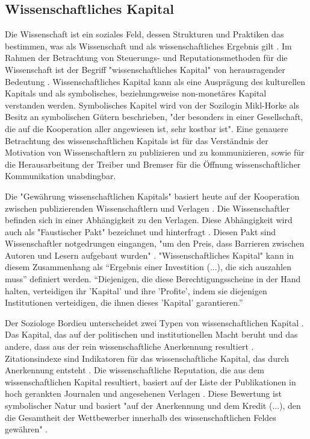 \begin{enumerate}
\begin{end}
\subsection{Wissenschaftliches Kapital}

Die Wissenschaft ist ein soziales Feld, dessen Strukturen und Praktiken das bestimmen, was als Wissenschaft und als wissenschaftliches Ergebnis gilt \cite{mikl_2010_soziologie}. Im Rahmen der Betrachtung von Steuerungs- und Reputationsmethoden für die Wissenschaft ist der Begriff "wissenschaftliches Kapital" von herausragender Bedeutung \cite{suchen}. Wissenschaftliches Kapital kann als eine Ausprägung des kulturellen Kapitals und als symbolisches, beziehungsweise non-monetäres Kapital \cite{irmer2011} \cite{hagner_2015_sache_buches} verstanden werden. Symbolisches Kapitel wird von der Sozilogin Mikl-Horke als Besitz an symbolischen Gütern beschrieben, "der besonders in einer Gesellschaft, die auf die Kooperation aller angewiesen ist, sehr kostbar ist"\cite{mikl_2010_soziologie}. Eine genauere Betrachtung des wissenschaftlichen Kapitals ist für das Verständnis der Motivation von Wissenschaftlern zu publizieren und zu kommunizieren, sowie für die Herausarbeitung der Treiber und Bremser für die Öffnung wissenschaftlicher Kommunikation unabdingbar.

Die "Gewährung wissenschaftlichen Kapitals" basiert heute auf der Kooperation zwischen publizierenden Wissenschaftlern und Verlagen \cite{herb_2006}. Die Wissenschaftler befinden sich in einer Abhängigkeit zu den Verlagen. Diese Abhängigkeit wird auch als "Faustischer Pakt" bezeichnet und hinterfragt \cite{hagner_2015_sache_buches} \cite{Parks_2002_acadamic_faust}. Diesen Pakt sind Wissenschaftler notgedrungen eingangen, "um den Preis, dass Barrieren zwischen Autoren und Lesern aufgebaut wurden" \cite{hagner_2015_sache_buches}. "Wissenschaftliches Kapital" kann in diesem Zusammenhang als “Ergebnis einer Investition (...), die sich auszahlen muss” \cite{herb_2006} definiert werden. “Diejenigen, die diese Berechtigungsscheine in der Hand halten, verteidigen ihr 'Kapital' und ihre 'Profite', indem sie diejenigen Institutionen verteidigen, die ihnen dieses 'Kapital' garantieren.” \cite{Bourdieu_1992}

Der Soziologe Bordieu unterscheidet zwei Typen von wissenschaftlichen Kapital \cite{Bourdieu_1998}. Das Kapital, das auf der politischen und institutionellen Macht beruht und das andere, dass aus der rein wissenschaftliche Anerkennung resultiert \cite{mikl_2010_soziologie}. Zitationsindexe sind Indikatoren für das wissenschaftliche Kapital, das durch Anerkennung entsteht \cite{Bourdieu_1998}. Die wissenschaftliche Reputation, die aus dem wissenschaftlichen Kapital resultiert, basiert auf der Liste der Publikationen in hoch gerankten Journalen und angesehenen Verlagen \cite{herb_2010}. Diese Bewertung ist symbolischer Natur und basiert "auf der Anerkennung und dem Kredit (...), den die Gesamtheit der Wettbewerber innerhalb des wissenschaftlichen Feldes gewähren" \cite{Bourdieu_1998} \cite{herb_2010}.


\end{end}
\end{enumerate}
